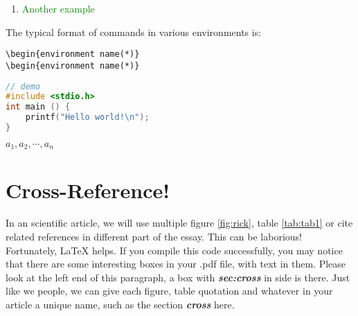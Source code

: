 \documentclass[12pt, letterpaper]{article} %
\begin{document}
\begin{enumerate} %
\item \textcolor{green}{Another example}
\end{enumerate} %

\begin{center} %
The typical format of commands in various environments is: 
\begin{verbatim} 
\begin{environment name(*)}
\begin{environment name(*)}
\end{verbatim} %
\end{center} %

\begin{lstlisting}[language=C++] 
// demo
#include <stdio.h>
int main () {
    printf("Hello world!\n");
}
\end{lstlisting}   %

\newcommand{\myvector}[1]{${#1}_1,{#1}_2,\cdots,{#1}_n$} %
\myvector{a} %



\section{Cross-Reference!} %
\label{sec:cross} %
In an scientific article, we will use multiple figure \ref{fig:rick}, table \ref{tab:tab1} or cite related references 
in different part of the essay. This can be laborious! Fortunately, \LaTeX $ $ helps. If you compile this code 
successfully, you may notice that there are some interesting boxes in your .pdf file, with text in them. Please 
look at the left end of this paragraph, a box with \textsl{\textbf{sec:cross}} in side is there. Just like we people, 
we can give each figure, table quotation and whatever in your article a unique name, such as 
the section \textsl{\textbf{cross}} here. %
\end{document}

